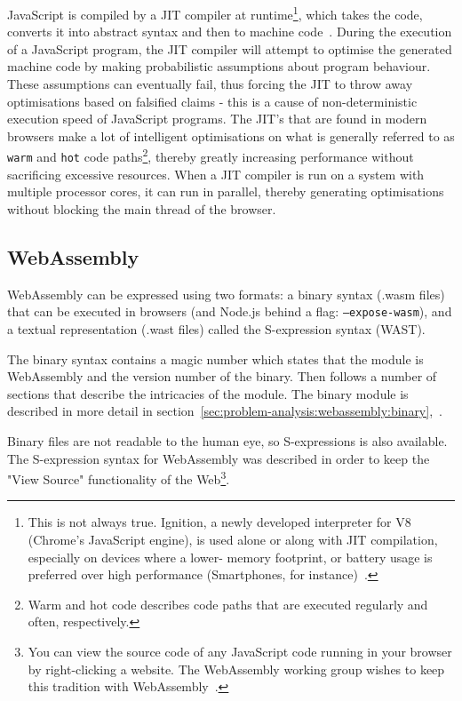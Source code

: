 \documentclass[a4paper]{article}
\begin{document}
JavaScript is compiled by a JIT compiler at runtime\footnote{This is not always true. Ignition, a newly developed interpreter for V8 (Chrome's JavaScript engine), is used alone or along with JIT compilation, especially on devices where a lower- memory footprint, or battery usage is preferred over high performance (Smartphones, for instance)~\cite{video:thompson-js-perf-v8-and-wasm}.}, which takes the code, converts it into abstract syntax and then to machine code~\cite[p.~13]{slides:lund-v8}. During the execution of a JavaScript program, the JIT compiler will attempt to optimise the generated machine code by making probabilistic assumptions about program behaviour. These assumptions can eventually fail, thus forcing the JIT to throw away optimisations based on falsified claims - this is a cause of non-deterministic execution speed of JavaScript programs. The JIT's that are found in modern browsers make a lot of intelligent optimisations on what is generally referred to as \texttt{warm} and \texttt{hot} code paths\footnote{Warm and hot code describes code paths that are executed regularly and often, respectively.}, thereby greatly increasing performance without sacrificing excessive resources. When a JIT compiler is run on a system with multiple processor cores, it can run in parallel, thereby generating optimisations without blocking the main thread of the browser.

\subsection{WebAssembly}
\label{sec:problem-analysis:webassembly}
WebAssembly can be expressed using two formats: a binary syntax (.wasm files) that can be executed in browsers (and Node.js behind a flag: \texttt{--expose-wasm}), and a textual representation (.wast files) called the S-expression syntax (WAST).

The binary syntax contains a magic number which states that the module is WebAssembly and the version number of the binary. Then follows a number of sections that describe the intricacies of the module. The binary module is described in more detail in section~\ref{sec:problem-analysis:webassembly:binary},~.

Binary files are not readable to the human eye, so S-expressions is also available. The S-expression syntax for WebAssembly was described in order to keep the "View Source" functionality of the Web\footnote{You can view the source code of any JavaScript code running in your browser by right-clicking a website. The WebAssembly working group wishes to keep this tradition with WebAssembly~\cite{website:wasm-webassembly-high-level-goals}.}.
\end{document}
